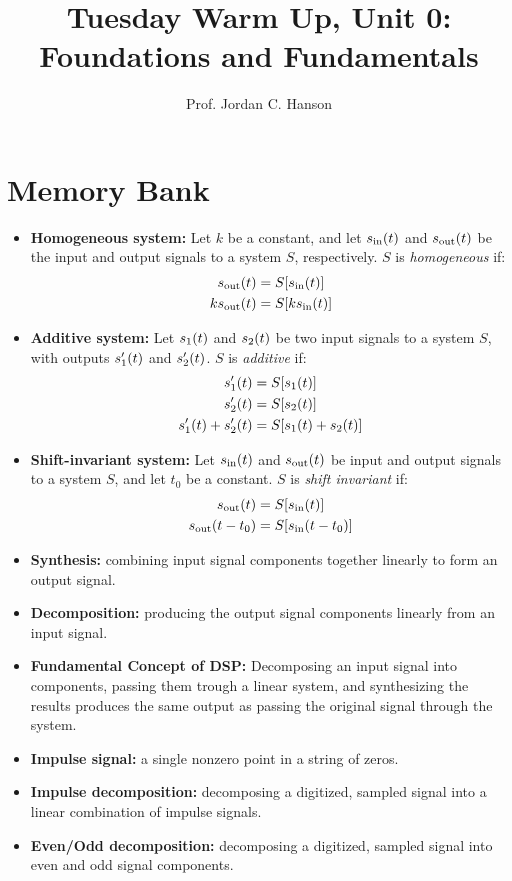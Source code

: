 \documentclass{article}
\begin{document}
\twocolumn

\title{Tuesday Warm Up, Unit 0: Foundations and Fundamentals}
\author{Prof. Jordan C. Hanson}
\maketitle

\section{Memory Bank}
\small
\begin{itemize}
\item \textbf{Homogeneous system:} Let $k$ be a constant, and let $s_{\rm in}(t)$ and $s_{\rm out}(t)$ be the input and output signals to a system $S$, respectively.  $S$ is \textit{homogeneous} if:
\begin{align}
s_{\rm out}(t) &= S[s_{\rm in}(t)] \\
k s_{\rm out}(t) &= S[k s_{\rm in}(t)]
\end{align}
\item \textbf{Additive system:} Let $s_{\rm 1}(t)$ and $s_{\rm 2}(t)$ be two input signals to a system $S$, with outputs $s'_{\rm 1}(t)$ and $s'_{\rm 2}(t)$.  $S$ is \textit{additive} if:
\begin{align}
s'_{\rm 1}(t) &= S[s_{\rm 1}(t)] \\
s'_{\rm 2}(t) &= S[s_{\rm 2}(t)] \\
s'_{\rm 1}(t)+s'_{\rm 2}(t) &= S[s_{\rm 1}(t)+s_{\rm 2}(t)]
\end{align}
\item \textbf{Shift-invariant system:} Let $s_{\rm in}(t)$ and $s_{\rm out}(t)$ be input and output signals to a system $S$, and let $t_0$ be a constant.  $S$ is \textit{shift invariant} if:
\begin{align}
s_{\rm out}(t) &= S[s_{\rm in}(t)] \\
s_{\rm out}(t-t_0) &= S[s_{\rm in}(t-t_0)] \\
\end{align}
\item \textbf{Synthesis:} combining input signal components together linearly to form an output signal.
\item \textbf{Decomposition:} producing the output signal components linearly from an input signal.
\item \textbf{Fundamental Concept of DSP:} Decomposing an input signal into components, passing them trough a linear system, and synthesizing the results produces the same output as passing the original signal through the system.
\item \textbf{Impulse signal:} a single nonzero point in a string of zeros.
\item \textbf{Impulse decomposition:} decomposing a digitized, sampled signal into a linear combination of impulse signals.
\item \textbf{Even/Odd decomposition:} decomposing a digitized, sampled signal into even and odd signal components.
\end{itemize}
\normalsize
\end{document}
